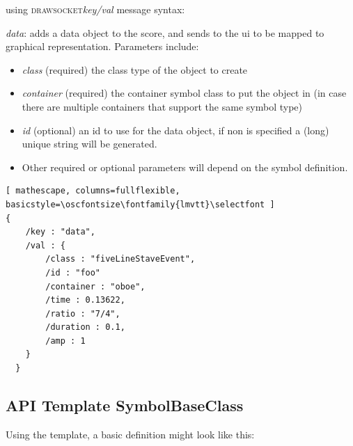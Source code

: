 \documentclass{article}
\def\drawsocket{\textsc{drawsocket}\xspace}
\def\oscfontsize{\footnotesize}
\begin{document}
using \drawsocket \textit{key/val} message syntax:

\textit{data}: adds a data object to the score, and sends to the ui to be mapped to graphical representation. Parameters include:
\begin{itemize}\itemsep0pt 
  \item \textit{class} (required) the class type of the object to create
  \item \textit{container} (required) the container symbol class to put the object in (in case there are multiple containers that support the same symbol type)
  \item \textit{id} (optional) an id to use for the data object, if non is specified a (long) unique string will be generated.
  \item Other required or optional parameters will depend on the symbol definition.
\end{itemize}

\begin{lstlisting}[ mathescape, columns=fullflexible, basicstyle=\oscfontsize\fontfamily{lmvtt}\selectfont ]
{
    /key : "data",
    /val : {
        /class : "fiveLineStaveEvent",
        /id : "foo"
        /container : "oboe",
        /time : 0.13622,
        /ratio : "7/4",
        /duration : 0.1,
        /amp : 1
    }
  }
\end{lstlisting}



\subsection{API Template SymbolBaseClass }\label{sec:template}


Using the template, a basic definition might look like this:
\end{document}
